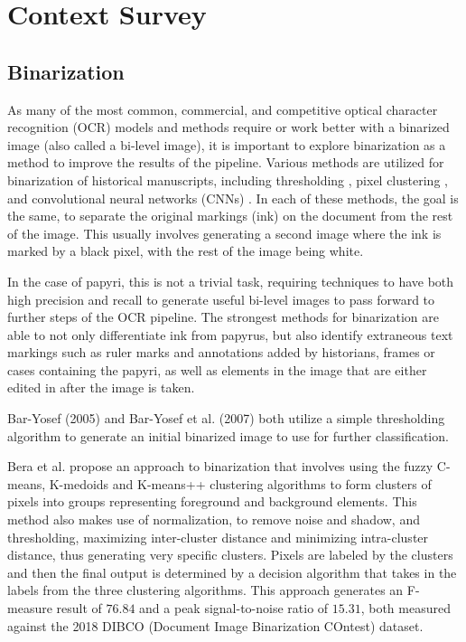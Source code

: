 \section{Context Survey}
\subsection{Binarization}
As many of the most common, commercial, and competitive optical character recognition (OCR) models and methods require or work better with a binarized image \cite{Gupta, SmithTesseract, SmithLines, Bar-Yosef2005, Bar-Yosef2007} (also called a bi-level image), it is important to explore binarization as a method to improve the results of the pipeline.
Various methods are utilized for binarization of historical manuscripts, including thresholding \cite{Bar-Yosef2005, Bar-Yosef2007}, pixel clustering \cite{Bera}, and convolutional neural networks (CNNs) \cite{Dhali2019, Dhali2020, Xiong}. In each of these methods, the goal is the same, to separate the original markings (ink) on the document from the rest of the image. This usually involves generating a second image where the ink is marked by a black pixel, with the rest of the image being white.

In the case of papyri, this is not a trivial task, requiring techniques to have both high precision and recall to generate useful bi-level images to pass forward to further steps of the OCR pipeline. The strongest methods for binarization are able to not only differentiate ink from papyrus, but also identify extraneous text markings such as ruler marks and annotations added by historians, frames or cases containing the papyri, as well as elements in the image that are either edited in after the image is taken.

Bar-Yosef (2005)\cite{Bar-Yosef2005} and Bar-Yosef et al. (2007)\cite{Bar-Yosef2005} both utilize a simple thresholding algorithm to generate an initial binarized image to use for further classification.

Bera et al.\cite{Bera} propose an approach to binarization that involves using the fuzzy C-means, K-medoids and K-means++ clustering algorithms to form clusters of pixels into groups representing foreground and background elements. This method also makes use of normalization, to remove noise and shadow, and thresholding, maximizing inter-cluster distance and minimizing intra-cluster distance, thus generating very specific clusters. Pixels are labeled by the clusters and then the final output is determined by a decision algorithm that takes in the labels from the three clustering algorithms. This approach generates an F-measure result of $76.84$ and a peak signal-to-noise ratio of $15.31$, both measured against the 2018 DIBCO (Document Image Binarization COntest) dataset\cite{DIBCO2018}.

